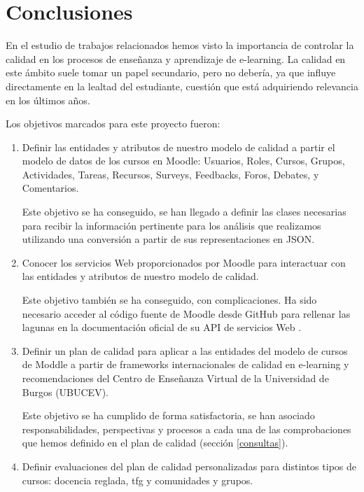 \section{Conclusiones}
	En el estudio de trabajos relacionados hemos visto la importancia de controlar la calidad en los procesos de enseñanza y aprendizaje de e-learning. La calidad en este ámbito suele tomar un papel secundario, pero no debería, ya que influye directamente en la lealtad del estudiante, cuestión que está adquiriendo relevancia en los últimos años.
	
	Los objetivos marcados para este proyecto fueron:
	\begin{enumerate}
		\item Definir las entidades y atributos de nuestro modelo de calidad a partir el modelo de datos de los cursos en Moodle: Usuarios, Roles, Cursos, Grupos, Actividades, Tareas, Recursos, Surveys, Feedbacks, Foros, Debates, y Comentarios.
		
		Este objetivo se ha conseguido, se han llegado a definir las clases necesarias para recibir la información pertinente para los análisis que realizamos utilizando una conversión a partir de sus representaciones en JSON.
		
		\item Conocer los servicios Web proporcionados por Moodle para interactuar con las entidades y atributos de nuestro modelo de calidad.
		
		Este objetivo también se ha conseguido, con complicaciones. Ha sido necesario acceder al código fuente de Moodle desde GitHub \cite{moodlerepository-2022} para rellenar las lagunas en la documentación oficial de su API de servicios Web \cite{wsapifunctions-2021}.
		
		\item Definir un plan de calidad para aplicar a las entidades del modelo de cursos de Moddle a partir de frameworks internacionales de calidad en e-learning y recomendaciones del Centro de Enseñanza Virtual de la Universidad de Burgos (UBUCEV). 
		
		Este objetivo se ha cumplido de forma satisfactoria, se han asociado responsabilidades, perspectivas y procesos a cada una de las comprobaciones que hemos definido en el plan de calidad (sección \ref{consultas}).
		
		\item Definir evaluaciones del plan de calidad 
		personalizadas para distintos tipos de cursos: docencia reglada, tfg y comunidades y grupos.
		

\end{enumerate}

